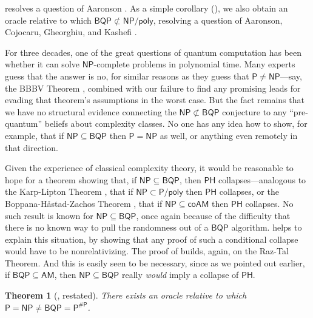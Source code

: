 \documentclass[11pt]{article}%
\newtheorem{theorem}{Theorem}
\begin{document}
 resolves a question of Aaronson \cite{Aar10}.
As a simple corollary (), we also obtain an oracle relative to which $\mathsf{BQP} \not\subset \mathsf{NP/poly}$, resolving a question of Aaronson, Cojocaru, Gheorghiu, and Kashefi \cite{ACGK19}.

For three decades, one of the great questions of quantum computation has been whether it can solve $\mathsf{NP}$-complete problems in polynomial time. Many experts guess that the answer is no, for similar reasons as they guess that $\mathsf{P} \neq \mathsf{NP}$---say, the BBBV Theorem \cite{BBBV97}, combined with our failure to find any promising leads for evading that theorem's assumptions in the worst case.  But the fact remains that we have no structural evidence connecting the $\mathsf{NP} \not\subset \mathsf{BQP}$ conjecture to any ``pre-quantum'' beliefs about complexity classes.  No one has any idea how to show, for example, that if $\mathsf{NP} \subseteq \mathsf{BQP}$ then $\mathsf{P} = \mathsf{NP}$ as well, or anything even remotely in that direction.

Given the experience of classical complexity theory, it would be
reasonable to hope for a theorem showing that, if $\mathsf{NP} \subseteq \mathsf{BQP}$, then $\mathsf{PH}$ collapses---analogous to the Karp-Lipton Theorem \cite{KL80}, that if $\mathsf{NP} \subset \mathsf{P/poly}$ then $\mathsf{PH}$ collapses, or the Boppana-H\r{a}stad-Zachos Theorem \cite{BHZ87}, that if $\mathsf{NP} \subseteq \mathsf{coAM}$ then $\mathsf{PH}$ collapses.  No such result is known for $\mathsf{NP} \subseteq \mathsf{BQP}$, once again because of the difficulty that there is no known way to pull the randomness out of a $\mathsf{BQP}$ algorithm.   helps to explain this situation, by showing that any proof of such a conditional collapse would have to be nonrelativizing.  The proof of  builds, again, on the Raz-Tal Theorem.  And this is easily seen to be necessary, since as we pointed out earlier, if $\mathsf{BQP} \subseteq \mathsf{AM}$, then $\mathsf{NP} \subseteq \mathsf{BQP}$ really \textit{would} imply a collapse of $\mathsf{PH}$.

\begin{theorem}[, restated]
\label{thm:p=np_bqp=pp_intro}
There exists an oracle relative to which $\mathsf{P} = \mathsf{NP} \neq \mathsf{BQP} = \mathsf{P^{\# P}}$.
\end{theorem}
\end{document}
